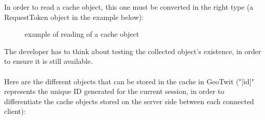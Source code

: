 \documentclass[a4paper,11pt]{report}
\begin{document}
\newpage
In order to read a cache object, this one must be converted in the right type (a RequestToken object in the example below):
\begin{figure}[H]
\vspace{-5pt}
\begin{center}
\vspace{-5pt}
\caption{example of reading of a cache object}
\end{center}
\end{figure}
\vspace{-10pt}

The developer has to think about testing the collected object's existence, in order to ensure it is still available.\\\\
Here are the different objects that can be stored in the cache in GeoTwit ("[id]" represents the unique ID generated for the current session, in order to differentiate the cache objects stored on the server side between each connected client):
\end{document}
